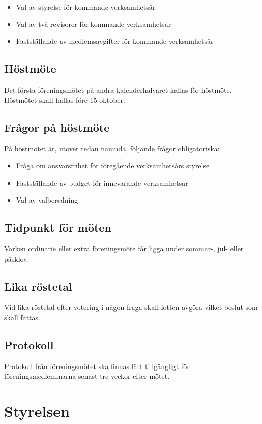 \documentclass[a4paper]{article}
\begin{document}
\begin{itemize}
  \item Val av styrelse för kommande verksamhetsår
  \item Val av två revisorer för kommande verksamhetsår
  \item Fastställande av medlemsavgifter för kommande verksamhetsår
\end{itemize}

\subsection{Höstmöte}
Det första föreningsmötet på andra kalenderhalvåret kallas för höstmöte. Höstmötet skall hållas före 15 oktober.

\subsection{Frågor på höstmöte}
På höstmötet är, utöver redan nämnda, följande frågor obligatoriska:

\begin{itemize}
  \item Fråga om ansvarsfrihet för föregående verksamhetsårs styrelse
  \item Fastställande av budget för innevarande verksamhetsår
  \item Val av valberedning
\end{itemize}

\subsection{Tidpunkt för möten}
Varken ordinarie eller extra föreningsmöte får ligga under sommar-, jul- eller påsklov.

\subsection{Lika röstetal}
Vid lika röstetal efter votering i någon fråga skall lotten avgöra vilket beslut som skall fattas.

\subsection{Protokoll}
Protokoll från föreningsmötet ska finnas lätt tillgängligt för föreningsmedlemmarna senast tre veckor efter mötet.

\section{Styrelsen}
\label{section:styrelsen}
\end{document}
